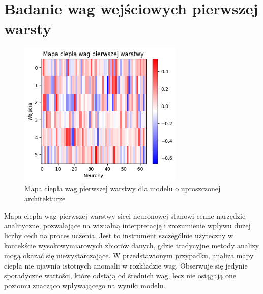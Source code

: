 \documentclass[a4paper,twoside,12pt]{book}
\begin{document}
\section{Badanie wag wejściowych pierwszej warsty}
\begin{figure}[!h]
	\centering
	\includegraphics[width=0.7\textwidth]{img/heatmap1.png}
	\caption{Mapa ciepła wag pierwszej warstwy dla modelu o uproszczonej architekturze}
	\label{fig:etykieta-rysunku}
\end{figure}

Mapa ciepła wag pierwszej warstwy sieci neuronowej stanowi cenne narzędzie analityczne, pozwalające na wizualną interpretację i zrozumienie wpływu dużej liczby cech na proces uczenia. Jest to instrument szczególnie użyteczny w kontekście wysokowymiarowych zbiorów danych, gdzie tradycyjne metody analizy mogą okazać się niewystarczające. W przedstawionym przypadku, analiza mapy ciepła nie ujawnia istotnych anomalii w rozkładzie wag. Obserwuje się jedynie sporadyczne wartości, które odstają od średnich wag, lecz nie osiągają one poziomu znacząco wpływającego na wyniki modelu.
\end{document}
